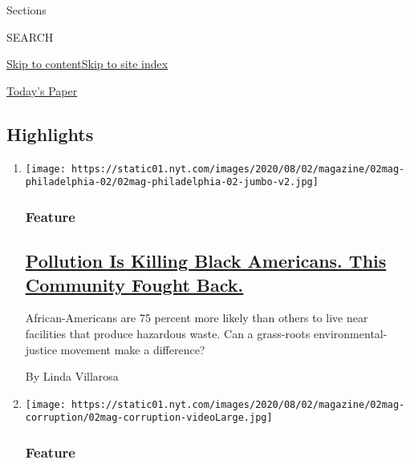 Sections

SEARCH

\protect\hyperlink{site-content}{Skip to
content}\protect\hyperlink{site-index}{Skip to site index}

\href{https://myaccount.nytimes.com/auth/login?response_type=cookie\&client_id=vi}{}

\href{https://www.nytimes.com/section/todayspaper}{Today's Paper}

\hypertarget{highlights}{%
\subsection{Highlights}\label{highlights}}

\begin{enumerate}
\def\labelenumi{\arabic{enumi}.}
\item
  \texttt{[image: https://static01.nyt.com/images/2020/08/02/magazine/02mag-philadelphia-02/02mag-philadelphia-02-jumbo-v2.jpg]}

  \hypertarget{feature}{%
  \subsubsection{Feature}\label{feature}}

  \hypertarget{pollution-is-killing-black-americans-this-community-fought-back}{%
  \subsection{\texorpdfstring{\href{/2020/07/28/magazine/pollution-philadelphia-black-americans.html}{Pollution
  Is Killing Black Americans. This Community Fought
  Back.}}{Pollution Is Killing Black Americans. This Community Fought Back.}}\label{pollution-is-killing-black-americans-this-community-fought-back}}

  African-Americans are 75 percent more likely than others to live near
  facilities that produce hazardous waste. Can a grass-roots
  environmental-justice movement make a difference?

  By Linda Villarosa
\item
  \texttt{[image: https://static01.nyt.com/images/2020/08/02/magazine/02mag-corruption/02mag-corruption-videoLarge.jpg]}

  \hypertarget{feature-1}{%
  \subsubsection{Feature}\label{feature-1}}


\end{enumerate}
